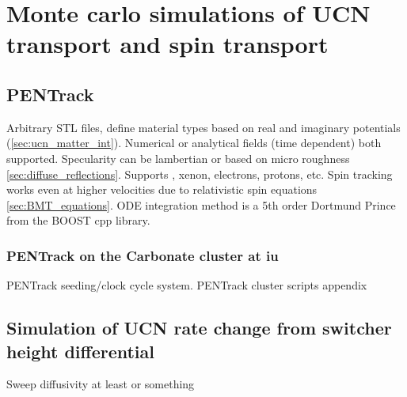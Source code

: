
\chapter{Monte carlo simulations of UCN transport and spin transport}\label{chap:simulations}



\section{PENTrack}


Arbitrary STL files, define material types based on real and imaginary potentials (\ref{sec:ucn_matter_int}). Numerical or analytical fields (time dependent) both supported. Specularity can be lambertian or based on micro roughness \ref{sec:diffuse_reflections}. Supports \hg, xenon, electrons, protons, etc. Spin tracking works even at higher velocities due to relativistic spin equations \ref{sec:BMT_equations}. ODE integration method is a 5th order Dortmund Prince \cite{numerical_recipes} from the BOOST cpp library. \cite{schreyer_pentrack}


\subsection
{
    \texorpdfstring{PENTrack on the Carbonate cluster at \acrshort{iu}}
                    {PENTrack on the Carbonate cluster at IU}
}


PENTrack seeding/clock cycle system. PENTrack cluster scripts appendix


\section{Simulation of UCN rate change from switcher height differential}\label{sec:switcher_height_monte_carlo}


Sweep diffusivity at least or something


